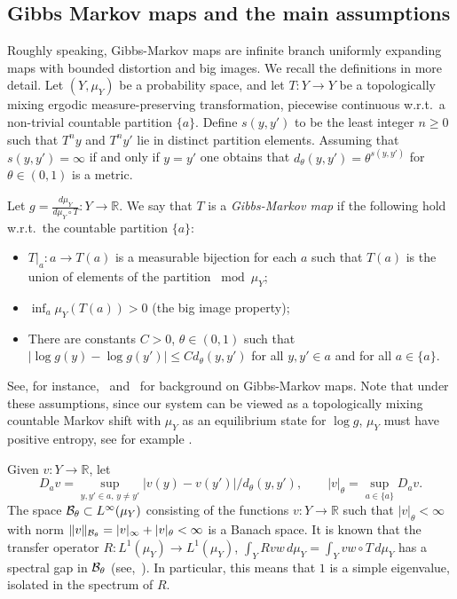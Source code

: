 \documentclass[12pt]{article}
\numberwithin{equation}{section}
\newcommand{\R}{\mathbb{R}}
\begin{document}
\subsection{Gibbs Markov maps and the main assumptions}

Roughly speaking, Gibbs-Markov maps are infinite branch uniformly expanding maps with bounded distortion and big images. 
We recall the definitions in more detail.
Let $(Y,\mu_Y)$ be a probability space, and let $T:Y\to Y$ be a topologically mixing ergodic measure-preserving transformation, piecewise continuous w.r.t.\ 
a non-trivial countable partition $\{a\}$.
Define $s(y,y')$ to be the least integer $n\ge0$ such that $T^ny$ and $T^ny'$ lie in distinct partition elements.
Assuming  that $s(y,y')=\infty$ if and only if $y=y'$ one obtains that $d_\theta(y,y')=\theta^{s(y,y')}$
for $\theta\in(0,1)$ is a metric.

Let $g=\frac{d\mu_Y}{d\mu_Y\circ T}:Y\to\R$.
We say that $T$ is a \emph{Gibbs-Markov map} if the following hold w.r.t.\ the countable partition $\{a\}$:
\begin{itemize}

\parskip = -2pt
\item $T|_a:a\to T(a)$ is a measurable bijection for each $a$
such that $T(a)$ is the union of elements of the partition $\bmod\mu_Y$;
\item $\inf_a\mu_Y(T(a))>0$ (the big image property);
\item
There are constants $C>0$, $\theta\in(0,1)$ such that
$|\log g(y)-\log g(y')|\le Cd_\theta(y,y')$ for all $y,y'\in a$ and for all $a\in\{a\}$.
\end{itemize}
See, for instance,~\cite[Chapter 4]{Aaronson} and~\cite{AD01}
for background on Gibbs-Markov maps.  Note that under these assumptions, since our system can be viewed as a topologically mixing countable Markov shift with $\mu_Y$ as an equilibrium state for $\log g$, $\mu_Y$ must have positive entropy, see for example \cite[Theorem 5.6]{Sar15}.


Given $v:Y\to\R$, let
\[
D_av=\sup_{y,y'\in a,\,y\neq y'}|v(y)-v(y')|/d_\theta(y,y'),\qquad |v|_\theta=\sup_{a\in\{a\}}D_a v.
\]
The space $\mathcal{B}_\theta\subset L^\infty(\mu_Y)$ consisting of the functions
$v:Y\to\R$ such that $|v|_\theta<\infty$ with norm
$\|v\|_{\mathcal{B}_\theta}=|v|_\infty+|v|_\theta<\infty$ is a Banach space. It is known that the transfer operator $R: L^1(\mu_Y)\to L^1(\mu_Y)$, $\int_Y R v w\, d\mu_Y=\int_Y v w\circ T\, d\mu_Y$ has a spectral gap in $\mathcal{B}_\theta$ (see,~\cite[Chapter 4]{Aaronson}). In particular, this means that $1$ is a simple eigenvalue, isolated in
the spectrum of $R$.
\end{document}

